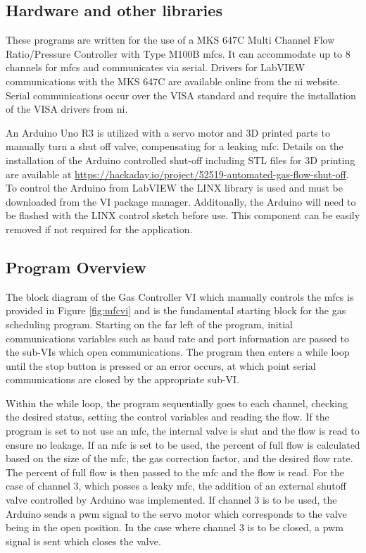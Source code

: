     \subsection{Hardware and other libraries}
        These programs are written for the use of a MKS 647C Multi Channel Flow Ratio/Pressure Controller with Type M100B \glspl{mfc}.
        It can accommodate up to 8 channels for \glspl{mfc} and communicates via serial.
        Drivers for LabVIEW communications with the MKS 647C are available online from the \gls{ni} website.
        Serial communications occur over the VISA standard and require the installation of the VISA drivers from \gls{ni}.

        An Arduino Uno R3 is utilized with a servo motor and 3D printed parts to manually turn a shut off valve, compensating for a leaking \gls{mfc}.
        Details on the installation of the Arduino controlled shut-off including STL files for 3D printing are available at \href{https://hackaday.io/project/52519-automated-gas-flow-shut-off}{https://hackaday.io/project/52519-automated-gas-flow-shut-off}.
        To control the Arduino from LabVIEW the LINX library is used and must be downloaded from the VI package manager.
        Additonally, the Arduino will need to be flashed with the LINX control sketch before use.
        This component can be easily removed if not required for the application.

    \subsection{Program Overview}
    The block diagram of the Gas Controller VI which manually controls the \glspl{mfc} is provided in Figure \ref{fig:mfcvi} and is the fundamental starting block for the gas scheduling program.
    Starting on the far left of the program, initial communications variables such as baud rate and port information are passed to the sub-VIs which open communications.
    The program then enters a while loop until the stop button is pressed or an error occurs, at which point serial communications are closed by the appropriate sub-VI.

    Within the while loop, the program sequentially goes to each channel, checking the desired status, setting the control variables and reading the flow.
    If the program is set to not use an \gls{mfc}, the internal valve is shut and the flow is read to ensure no leakage.
    If an \gls{mfc} is set to be used, the percent of full flow is calculated based on the size of the \gls{mfc}, the gas correction factor, and the desired flow rate.
    The percent of full flow is then passed to the \gls{mfc} and the flow is read.
    For the case of channel 3, which posses a leaky \gls{mfc}, the addition of an external shutoff valve controlled by Arduino was implemented.
    If channel 3 is to be used, the Arduino sends a \gls{pwm} signal to the servo motor which corresponds to the valve being in the open position.
    In the case where channel 3 is to be closed, a \gls{pwm} signal is sent which closes the valve.


